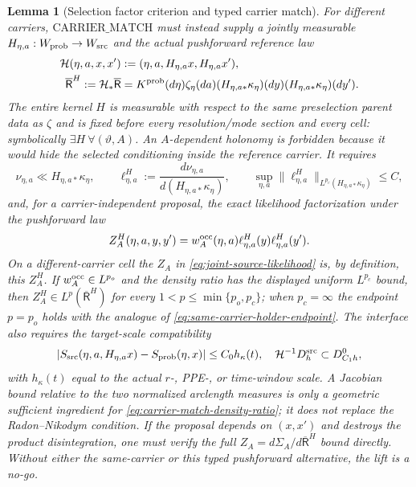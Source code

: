 \documentclass[11pt]{article}
\newtheorem{lemma}[theorem]{Lemma}
\begin{document}
\begin{lemma}[Selection factor criterion and typed carrier match]
For different carriers, $\mathrm{CARRIER\_MATCH}$ must instead supply a
jointly measurable $H_{\eta,a}:W_{\rm prob}\to W_{\rm src}$ and the actual
pushforward reference law
\begin{equation}
\label{eq:carrier-match-pushforward-law}
\begin{aligned}
 \mathcal H(\eta,a,x,x')&:=
  (\eta,a,H_{\eta,a}x,H_{\eta,a}x'),\\
 \overline{\mathsf R}^{H}:=\mathcal H_*\overline{\mathsf R}
 &=K^{\rm prob}(d\eta)\zeta_\eta(da)
   (H_{\eta,a*}\kappa_\eta)(dy)
   (H_{\eta,a*}\kappa_\eta)(dy').
\end{aligned}
\end{equation}
The entire kernel $H$ is measurable with respect to the same preselection
parent data as $\zeta$ and is fixed before every resolution/mode section and
every cell: symbolically $\exists H\ \forall(\vartheta,A)$.  An
$A$-dependent holonomy is forbidden because it would hide the selected
conditioning inside the reference carrier.
It requires
\begin{equation}
\label{eq:carrier-match-density-ratio}
 \nu_{\eta,a}\ll H_{\eta,a*}\kappa_\eta,
 \qquad \ell_{\eta,a}^{H}:=
 \frac{d\nu_{\eta,a}}{d(H_{\eta,a*}\kappa_\eta)},
 \qquad
 \sup_{\eta,a}\|\ell_{\eta,a}^{H}\|_{
 L^{p_c}(H_{\eta,a*}\kappa_\eta)}\le C,
\end{equation}
and, for a carrier-independent proposal, the exact likelihood
factorization under the pushforward law
\begin{equation}
\label{eq:carrier-match-likelihood-factorization}
 Z_A^{H}(\eta,a,y,y')
 =w_A^{\rm occ}(\eta,a)
   \ell_{\eta,a}^{H}(y)\ell_{\eta,a}^{H}(y').
\end{equation}
On a different-carrier cell the $Z_A$ in
\eqref{eq:joint-source-likelihood} is, by definition, this $Z_A^{H}$.
If $w_A^{\rm occ}\in L^{p_o}$ and the density ratio has the displayed
uniform $L^{p_c}$ bound, then
$Z_A^{H}\in L^p(\overline{\mathsf R}^{H})$ for every
$1<p\le\min\{p_o,p_c\}$; when $p_c=\infty$ the endpoint $p=p_o$ holds with
the analogue of \eqref{eq:same-carrier-holder-endpoint}.
The interface also requires the target-scale compatibility
\begin{equation}
\label{eq:carrier-match-slope-window}
 |S_{\rm src}(\eta,a,H_{\eta,a}x)-S_{\rm prob}(\eta,x)|
 \le C_0h_\kappa(t),
 \quad
 \mathcal H^{-1}D_h^{\rm src}\subset D_{C_1h}^{0},
\end{equation}
with $h_\kappa(t)$ equal to the actual $r$-, PPE-, or time-window scale.
A Jacobian bound relative to the two normalized arclength measures is only a
geometric sufficient ingredient for \eqref{eq:carrier-match-density-ratio};
it does not replace the Radon--Nikodym condition.  If the proposal depends on
$(x,x')$ and destroys the product disintegration, one must verify the full
$Z_A=d\Sigma_A/d\overline{\mathsf R}^{H}$ bound directly.  Without either
the same-carrier or this typed pushforward alternative, the lift is a no-go.
\end{lemma}
\end{document}
